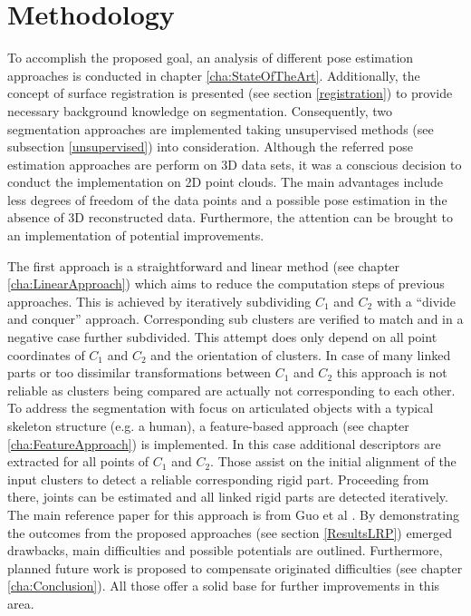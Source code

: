 \section{Methodology}
To accomplish the proposed goal, an analysis of different pose estimation approaches is conducted in chapter \ref{cha:StateOfTheArt}. Additionally, the concept of surface registration is presented (see section \ref{registration}) to provide necessary background knowledge on segmentation. Consequently, two segmentation approaches are implemented taking unsupervised methods (see subsection \ref{unsupervised}) into consideration. Although the referred pose estimation approaches are perform on 3D data sets, it was a conscious decision to conduct the implementation on 2D point clouds. The main advantages include less degrees of freedom of the data points and a possible pose estimation in the absence of 3D reconstructed data. Furthermore, the attention can be brought to an implementation of potential improvements.

The first approach is a straightforward and linear method (see chapter \ref{cha:LinearApproach}) which aims to reduce the computation steps of previous approaches. This is achieved by iteratively subdividing $C_1$ and $C_2$ with a ``divide and conquer'' approach. Corresponding sub clusters are verified to match and in a negative case further subdivided. This attempt does only depend on all point coordinates of $C_1$ and $C_2$ and the orientation of clusters. In case of many linked parts or too dissimilar transformations between $C_1$ and $C_2$ this approach is not reliable as clusters being compared are actually not corresponding to each other. To address the segmentation with focus on articulated objects with a typical skeleton structure (e.g. a human), a feature-based approach (see chapter \ref{cha:FeatureApproach}) is implemented. In this case additional descriptors are extracted for all points of $C_1$ and $C_2$. Those assist on the initial alignment of the input clusters to detect a reliable corresponding rigid part. Proceeding from there, joints can be estimated and all linked rigid parts are detected iteratively. The main reference paper for this approach is from Guo et al \cite{guo2016correspondence}. By demonstrating the outcomes from the proposed approaches (see section \ref{ResultsLRP}) emerged drawbacks, main difficulties and possible potentials are outlined. Furthermore, planned future work is proposed to compensate originated difficulties (see chapter \ref{cha:Conclusion}). All those offer a solid base for further improvements in this area. 




